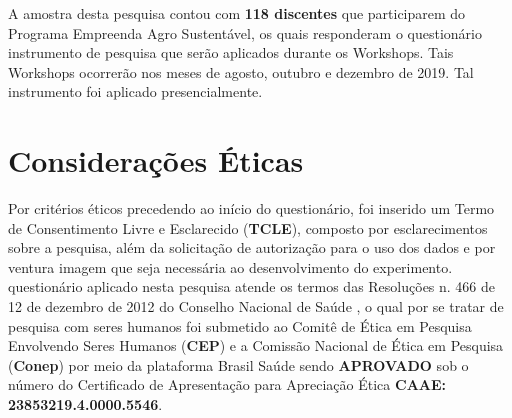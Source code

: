 A amostra desta pesquisa contou com \textbf{118 discentes} que participarem do Programa Empreenda Agro Sustentável, os quais responderam o questionário instrumento de pesquisa que serão aplicados durante os Workshops. Tais Workshops ocorrerão nos meses de agosto, outubro e dezembro de 2019. Tal instrumento foi aplicado presencialmente. 


\section{Considerações Éticas}

Por critérios éticos precedendo ao início do questionário, foi inserido um Termo de Consentimento Livre e Esclarecido (\textbf{TCLE}), composto por esclarecimentos sobre a pesquisa, além da solicitação de autorização para o uso dos dados e por ventura imagem que seja necessária ao desenvolvimento do experimento. questionário aplicado nesta pesquisa atende os termos das Resoluções n. 466 de 12 de dezembro de 2012 do Conselho Nacional de Saúde \cite{cns_resolucao_2012}, o qual por se tratar de pesquisa com seres humanos foi submetido ao Comitê de Ética em Pesquisa Envolvendo Seres Humanos (\textbf{CEP}) e a Comissão Nacional de Ética em Pesquisa (\textbf{Conep}) por meio da plataforma Brasil Saúde sendo \textbf{APROVADO} sob o número do Certificado de Apresentação para Apreciação Ética \textbf{CAAE: 23853219.4.0000.5546}.




